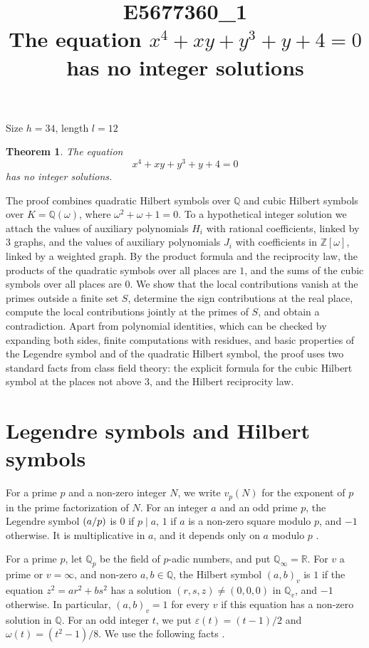 \documentclass[11pt]{article}
\title{\textbf{E5677360\_1}\\[4pt] {\Large The equation $x^{4}+xy+y^{3}+y+4=0$ has no integer solutions}}
\author{}
\date{}
\newtheorem{theorem}{Theorem}
\newcommand{\Z}{\mathbb{Z}}
\newcommand{\Q}{\mathbb{Q}}
\newcommand{\leg}[2]{\mathchoice{\biggl(\dfrac{#1}{#2}\biggr)}{(#1/#2)}{(#1/#2)}{(#1/#2)}}
\begin{document}
\maketitle
\vspace{-8ex}
\begin{center}
Size $h=34$, length $l=12$
\end{center}

\begin{theorem}\label{thm:main}
The equation
\begin{equation}\label{eq:main}
x^{4}+xy+y^{3}+y+4=0
\end{equation}
has no integer solutions.
\end{theorem}

The proof combines quadratic Hilbert symbols over $\Q$ and cubic Hilbert symbols over $K=\Q(\omega)$, where $\omega^2+\omega+1=0$. To a hypothetical integer solution we attach the values of auxiliary polynomials $H_i$ with rational coefficients, linked by 3 graphs, and the values of auxiliary polynomials $J_i$ with coefficients in $\Z[\omega]$, linked by a weighted graph. By the product formula and the reciprocity law, the products of the quadratic symbols over all places are $1$, and the sums of the cubic symbols over all places are $0$. We show that the local contributions vanish at the primes outside a finite set $S$, determine the sign contributions at the real place, compute the local contributions jointly at the primes of $S$, and obtain a contradiction. Apart from polynomial identities, which can be checked by expanding both sides, finite computations with residues, and basic properties of the Legendre symbol and of the quadratic Hilbert symbol, the proof uses two standard facts from class field theory: the explicit formula for the cubic Hilbert symbol at the places not above $3$, and the Hilbert reciprocity law.

\section{Legendre symbols and Hilbert symbols}

For a prime $p$ and a non-zero integer $N$, we write $v_p(N)$ for the exponent of $p$ in the prime factorization of $N$. For an integer $a$ and an odd prime $p$, the Legendre symbol $\leg{a}{p}$ is $0$ if $p\mid a$, $1$ if $a$ is a non-zero square modulo $p$, and $-1$ otherwise. It is multiplicative in $a$, and it depends only on $a$ modulo $p$ \cite[Chapter~5]{IR}.

For a prime $p$, let $\Q_p$ be the field of $p$-adic numbers, and put $\Q_\infty=\mathbb R$. For $v$ a prime or $v=\infty$, and non-zero $a,b\in\Q$, the Hilbert symbol $(a,b)_v$ is $1$ if the equation $z^2=ar^2+bs^2$ has a solution $(r,s,z)\neq(0,0,0)$ in $\Q_v$, and $-1$ otherwise. In particular, $(a,b)_v=1$ for every $v$ if this equation has a non-zero solution in $\Q$. For an odd integer $t$, we put $\varepsilon(t)=(t-1)/2$ and $\omega(t)=(t^2-1)/8$. We use the following facts \cite[Chapter~III, Proposition~2 and Theorems~1 and~3]{Se}.
\end{document}
